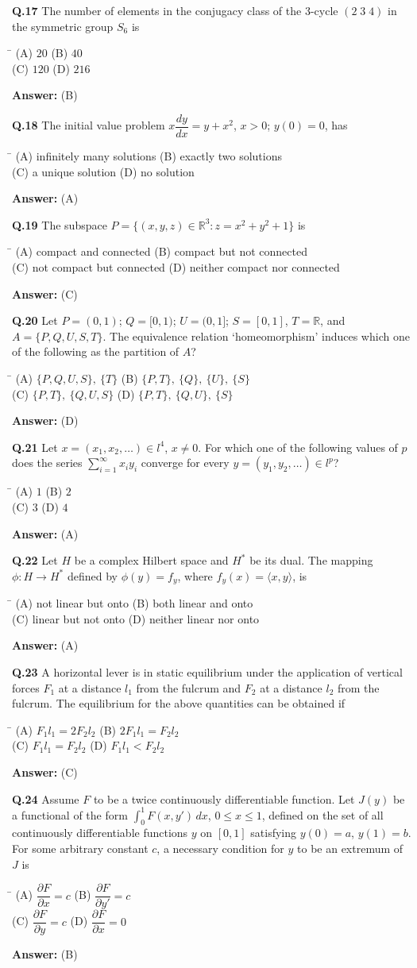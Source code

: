 \documentclass[11pt,a4paper]{article}
\newcommand{\optsfourA}[4]{%
  \begin{tabbing}
    \hspace{0.48\linewidth}\=\kill
    (A) #1 \> (B) #2 \\[2pt]
    (C) #3 \> (D) #4
  \end{tabbing}%
}
\newcommand{\ans}[1]{\textbf{Answer:} #1\par\medskip}
\begin{document}
\textbf{Q.17} The number of elements in the conjugacy class of the $3$-cycle $(2\;3\;4)$ in the symmetric group $S_6$ is
\optsfourA{$20$}{$40$}{$120$}{$216$}
\ans{(B)}

\textbf{Q.18} The initial value problem $x\dfrac{dy}{dx} = y + x^2$, $x > 0$; $y(0) = 0$, has
\optsfourA{infinitely many solutions}{exactly two solutions}{a unique solution}{no solution}
\ans{(A)}

\textbf{Q.19} The subspace $P = \{(x, y, z) \in \mathbb{R}^3 : z = x^2 + y^2 + 1\}$ is
\optsfourA{compact and connected}{compact but not connected}{not compact but connected}{neither compact nor connected}
\ans{(C)}

\textbf{Q.20} Let $P = (0, 1)$; $Q = [0, 1)$; $U = (0, 1]$; $S = [0, 1]$, $T = \mathbb{R}$, and $A = \{P, Q, U, S, T\}$. The equivalence relation `homeomorphism' induces which one of the following as the partition of $A$?
\optsfourA{$\{P, Q, U, S\},\ \{T\}$}{$\{P, T\},\ \{Q\},\ \{U\},\ \{S\}$}{$\{P, T\},\ \{Q, U, S\}$}{$\{P, T\},\ \{Q, U\},\ \{S\}$}
\ans{(D)}

\textbf{Q.21} Let $x = (x_1, x_2, \dots) \in l^4$, $x \ne 0$. For which one of the following values of $p$ does the series $\displaystyle\sum_{i=1}^{\infty} x_i y_i$ converge for every $y = (y_1, y_2, \dots) \in l^p$?
\optsfourA{$1$}{$2$}{$3$}{$4$}
\ans{(A)}

\textbf{Q.22} Let $H$ be a complex Hilbert space and $H^*$ be its dual. The mapping $\phi : H \to H^*$ defined by $\phi(y) = f_y$, where $f_y(x) = \langle x, y \rangle$, is
\optsfourA{not linear but onto}{both linear and onto}{linear but not onto}{neither linear nor onto}
\ans{(A)}

\textbf{Q.23} A horizontal lever is in static equilibrium under the application of vertical forces $F_1$ at a distance $l_1$ from the fulcrum and $F_2$ at a distance $l_2$ from the fulcrum. The equilibrium for the above quantities can be obtained if
\optsfourA{$F_1 l_1 = 2 F_2 l_2$}{$2 F_1 l_1 = F_2 l_2$}{$F_1 l_1 = F_2 l_2$}{$F_1 l_1 < F_2 l_2$}
\ans{(C)}

\textbf{Q.24} Assume $F$ to be a twice continuously differentiable function. Let $J(y)$ be a functional of the form $\displaystyle\int_0^1 F(x, y')\,dx$, $0 \le x \le 1$, defined on the set of all continuously differentiable functions $y$ on $[0, 1]$ satisfying $y(0) = a$, $y(1) = b$. For some arbitrary constant $c$, a necessary condition for $y$ to be an extremum of $J$ is
\optsfourA{$\dfrac{\partial F}{\partial x} = c$}{$\dfrac{\partial F}{\partial y'} = c$}{$\dfrac{\partial F}{\partial y} = c$}{$\dfrac{\partial F}{\partial x} = 0$}
\ans{(B)}
\end{document}
